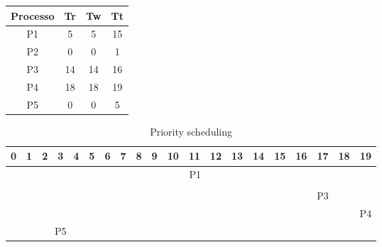 \documentclass[a4paper]{article}
\begin{document}
\begin{table}[htb]
   \centering
   \label{my-label}
   \begin{tabular}{|c|c|c|c|}
      \hline
      Processo & Tr & Tw & Tt \\ \hline
      P1       & 5  & 5  & 15 \\ \hline
      P2       & 0  & 0  & 1  \\ \hline
      P3       & 14 & 14 & 16 \\ \hline
      P4       & 18 & 18 & 19 \\ \hline
      P5       & 0  & 0  & 5  \\ \hline
   \end{tabular}
\end{table}

\begin{table}[htb]
   \centering
   \caption{Priority scheduling}
   \label{my-label}
   \begin{tabular}{|c|ccccc|cccccccccc|ccc|c|}
      \hline
      0                                                 & 1                                               & 2                                                & 3                                               & 4                          & 5 & 6 & 7 & 8 & 9 & 10 & 11 & 12 & 13 & 14 & 15 & 16 & 17 & 18 & 19 \\ \hline
                                                        & \multicolumn{5}{c|}{}                           & \multicolumn{10}{c|}{\cellcolor[HTML]{656565}P1} & \multicolumn{3}{c|}{}                           &                                                                                                  \\ \hline
      \cellcolor[HTML]{656565}{\color[HTML]{000000} P2} & \multicolumn{5}{c|}{}                           & \multicolumn{10}{c|}{}                           & \multicolumn{3}{c|}{}                           &                                                                                                  \\ \hline
                                                        & \multicolumn{5}{c|}{}                           & \multicolumn{10}{c|}{}                           & \multicolumn{3}{c|}{\cellcolor[HTML]{656565}P3} &                                                                                                  \\ \hline
                                                        & \multicolumn{5}{c|}{}                           & \multicolumn{10}{c|}{}                           & \multicolumn{3}{c|}{}                           & \cellcolor[HTML]{656565}P4                                                                       \\ \hline
                                                        & \multicolumn{5}{c|}{\cellcolor[HTML]{656565}P5} & \multicolumn{10}{c|}{}                           & \multicolumn{3}{c|}{}                           &                                                                                                  \\ \hline
   \end{tabular}
\end{table}
\end{document}
